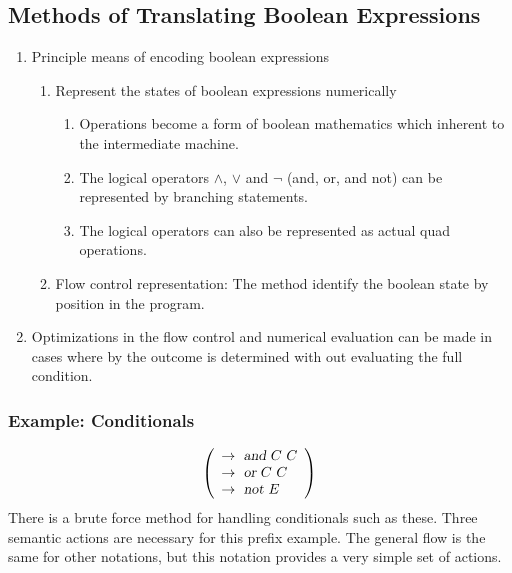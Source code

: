 \documentclass[11pt]{article}
\begin{document}
\newpage
\subsection {Methods of Translating Boolean Expressions} 

\begin{enumerate}
\item Principle means of encoding boolean expressions
\begin{enumerate}
\item Represent the states of boolean expressions numerically \\
\begin{enumerate}
\item Operations become a form of boolean mathematics which inherent to the intermediate machine.  
\item The logical operators $\wedge$, $\vee$ and $\neg$ (and, or, and not) can be represented by branching statements.  
\item The logical operators can also be represented as actual quad operations.  
\end{enumerate}

\item   Flow control representation:  The method identify the boolean state by position in the program.  
\end{enumerate}
\item Optimizations in the flow control and numerical evaluation can be made in cases where by the outcome is determined with out evaluating the full condition.  
\end{enumerate}


\subsubsection{Example: Conditionals}
\[
\left(
\begin{array}{l}
\to \textsl{ and } C \textsl{ } C 	  \\
\to \textsl{ or } C \textsl{ } C   \\
\to \textsl{ not } E    \\
\end{array}
\right)
\]
There is a brute force method for handling conditionals such as these.    Three semantic actions are necessary for this prefix example.    The general flow is the same for other notations, but this notation provides a very simple set of actions.  
\end{document}
